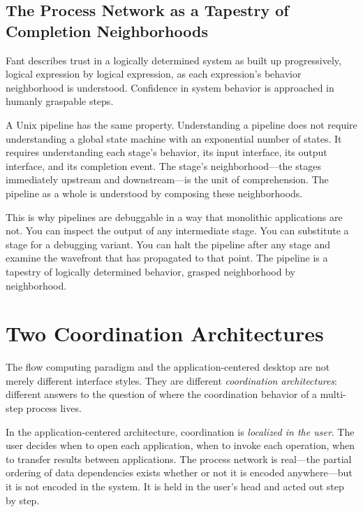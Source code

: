 \documentclass[12pt, a4paper]{article}
\begin{document}
\subsection{The Process Network as a Tapestry of Completion Neighborhoods}

Fant describes trust in a logically determined system as built up
progressively, logical expression by logical expression, as each
expression's behavior neighborhood is understood. Confidence in
system behavior is approached in humanly graspable steps.

A Unix pipeline has the same property. Understanding a pipeline does
not require understanding a global state machine with an exponential
number of states. It requires understanding each stage's behavior, its
input interface, its output interface, and its completion event. The
stage's neighborhood---the stages immediately upstream and
downstream---is the unit of comprehension. The pipeline as a whole is
understood by composing these neighborhoods.

This is why pipelines are debuggable in a way that monolithic
applications are not. You can inspect the output of any intermediate
stage. You can substitute a stage for a debugging variant. You can
halt the pipeline after any stage and examine the wavefront that has
propagated to that point. The pipeline is a tapestry of logically
determined behavior, grasped neighborhood by neighborhood.

\section{Two Coordination Architectures}

The flow computing paradigm and the application-centered desktop are
not merely different interface styles. They are different
\emph{coordination architectures}: different answers to the question
of where the coordination behavior of a multi-step process lives.

In the application-centered architecture, coordination is
\emph{localized in the user}. The user decides when to open each
application, when to invoke each operation, when to transfer results
between applications. The process network is real---the partial
ordering of data dependencies exists whether or not it is encoded
anywhere---but it is not encoded in the system. It is held in the
user's head and acted out step by step.
\end{document}
